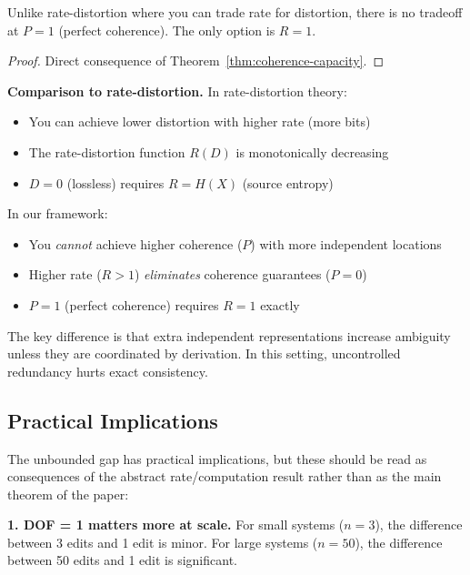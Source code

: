 \begin{corollary}[No Tradeoff at $P = 1$]\label{cor:no-tradeoff}
Unlike rate-distortion where you can trade rate for distortion, there is no tradeoff at $P = 1$ (perfect coherence). The only option is $R = 1$.
\end{corollary}

\begin{proof}
Direct consequence of Theorem~\ref{thm:coherence-capacity}.
\end{proof}

\textbf{Comparison to rate-distortion.} In rate-distortion theory:
\begin{itemize}
\tightlist
\item You can achieve lower distortion with higher rate (more bits)
\item The rate-distortion function $R(D)$ is monotonically decreasing
\item $D = 0$ (lossless) requires $R = H(X)$ (source entropy)
\end{itemize}

In our framework:
\begin{itemize}
\tightlist
\item You \emph{cannot} achieve higher coherence ($P$) with more independent locations
\item Higher rate ($R > 1$) \emph{eliminates} coherence guarantees ($P = 0$)
\item $P = 1$ (perfect coherence) requires $R = 1$ exactly
\end{itemize}

The key difference is that extra independent representations increase ambiguity unless they are coordinated by derivation. In this setting, uncontrolled redundancy hurts exact consistency.

\subsection{Practical Implications}\label{sec:practical-implications}

The unbounded gap has practical implications, but these should be read as consequences of the abstract rate/computation result rather than as the main theorem of the paper:

\textbf{1. DOF = 1 matters more at scale.} For small systems ($n = 3$), the difference between 3 edits and 1 edit is minor. For large systems ($n = 50$), the difference between 50 edits and 1 edit is significant.

